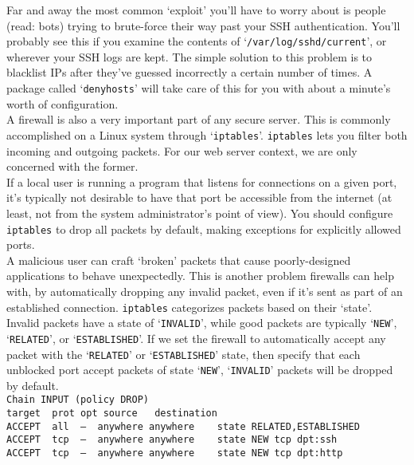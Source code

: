 \documentclass[10pt,letterpaper,titlepage]{article}
\begin{document}
\noindent Far and away the most common `exploit' you'll have to worry about is people (read: bots) trying to brute-force their way past your SSH authentication. You'll probably see this if you examine the contents of `\texttt{/var/log/sshd/current}', or wherever your SSH logs are kept. The simple solution to this problem is to blacklist IPs after they've guessed incorrectly a certain number of times. A package called `\texttt{denyhosts}' will take care of this for you with about a minute's worth of configuration.\cite{denyhosts}
\\

\noindent A firewall is also a very important part of any secure server. This is commonly accomplished on a Linux system through `\texttt{iptables}'. \texttt{iptables} lets you filter both incoming and outgoing packets. For our web server context, we are only concerned with the former. 
\\

\noindent If a local user is running a program that listens for connections on a given port, it's typically not desirable to have that port be accessible from the internet (at least, not from the system administrator's point of view). You should configure \texttt{iptables} to drop all packets by default, making exceptions for explicitly allowed ports.
\\

\noindent 
A malicious user can craft `broken' packets that cause poorly-designed applications to behave unexpectedly. This is another problem firewalls can help with, by automatically dropping any invalid packet, even if it's sent as part of an established connection. \texttt{iptables} categorizes packets based on their `state'. Invalid packets have a state of `\texttt{INVALID}', while good packets are typically `\texttt{NEW}', `\texttt{RELATED}', or `\texttt{ESTABLISHED}'.\cite{iptables} If we set the firewall to automatically accept any packet with the `\texttt{RELATED}' or `\texttt{ESTABLISHED}' state, then specify that each unblocked port accept packets of state `\texttt{NEW}', `\texttt{INVALID}' packets will be dropped by default.
\\

\noindent \texttt{Chain INPUT (policy DROP)\\
target  \   prot opt source        \  \     destination         \\
ACCEPT  \   all \ -- \ anywhere             anywhere    \  \  \    state RELATED,ESTABLISHED \\
ACCEPT  \   tcp \ -- \ anywhere             anywhere    \  \  \    state NEW tcp dpt:ssh \\
ACCEPT  \   tcp \ -- \ anywhere             anywhere    \  \  \    state NEW tcp dpt:http}
\\
\end{document}
